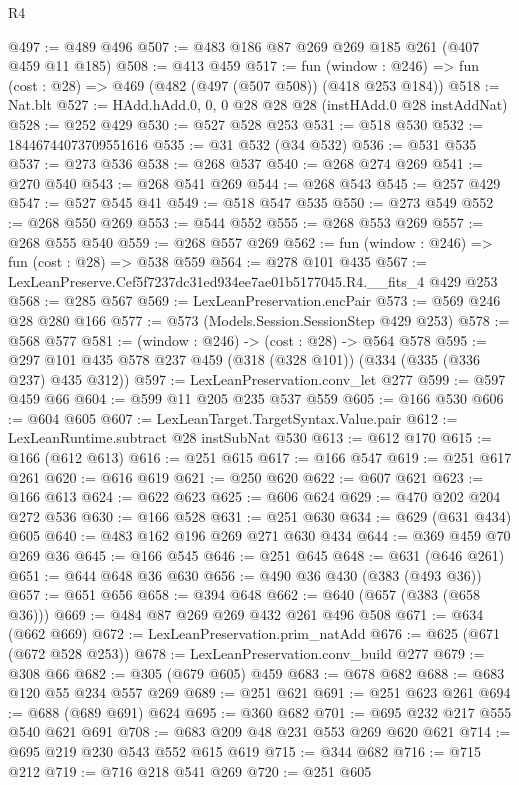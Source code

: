 \begin{lexlean}{R4}
\begin{coremodule}
@497 := @489 @496
@507 := @483 @186 @87 @269 @269 @185 @261 (@407 @459 @11 @185)
@508 := @413 @459
@517 := fun (window : @246) => fun (cost : @28) => @469 (@482 (@497 (@507 @508)) (@418 @253 @184))
@518 := Nat.blt
@527 := HAdd.hAdd.{0, 0, 0} @28 @28 @28 (instHAdd.{0} @28 instAddNat)
@528 := @252 @429
@530 := @527 @528 @253
@531 := @518 @530
@532 := 18446744073709551616
@535 := @31 @532 (@34 @532)
@536 := @531 @535
@537 := @273 @536
@538 := @268 @537
@540 := @268 @274 @269
@541 := @270 @540
@543 := @268 @541 @269
@544 := @268 @543
@545 := @257 @429
@547 := @527 @545 @41
@549 := @518 @547 @535
@550 := @273 @549
@552 := @268 @550 @269
@553 := @544 @552
@555 := @268 @553 @269
@557 := @268 @555 @540
@559 := @268 @557 @269
@562 := fun (window : @246) => fun (cost : @28) => @538 @559
@564 := @278 @101 @435
@567 := LexLeanPreserve.Cef5f7237dc31ed934ee7ae01b5177045.R4.__fits_4 @429 @253
@568 := @285 @567
@569 := LexLeanPreservation.encPair
@573 := @569 @246 @28 @280 @166
@577 := @573 (Models.Session.SessionStep @429 @253)
@578 := @568 @577
@581 := (window : @246) -> (cost : @28) -> @564 @578
@595 := @297 @101 @435 @578 @237 @459 (@318 (@328 @101)) (@334 (@335 (@336 @237) @435 @312))
@597 := LexLeanPreservation.conv_let @277
@599 := @597 @459 @66
@604 := @599 @11 @205 @235 @537 @559
@605 := @166 @530
@606 := @604 @605
@607 := LexLeanTarget.TargetSyntax.Value.pair
@612 := LexLeanRuntime.subtract @28 instSubNat @530
@613 := @612 @170
@615 := @166 (@612 @613)
@616 := @251 @615
@617 := @166 @547
@619 := @251 @617 @261
@620 := @616 @619
@621 := @250 @620
@622 := @607 @621
@623 := @166 @613
@624 := @622 @623
@625 := @606 @624
@629 := @470 @202 @204 @272 @536
@630 := @166 @528
@631 := @251 @630
@634 := @629 (@631 @434) @605
@640 := @483 @162 @196 @269 @271 @630 @434
@644 := @369 @459 @70 @269 @36
@645 := @166 @545
@646 := @251 @645
@648 := @631 (@646 @261)
@651 := @644 @648 @36 @630
@656 := @490 @36 @430 (@383 (@493 @36))
@657 := @651 @656
@658 := @394 @648
@662 := @640 (@657 (@383 (@658 @36)))
@669 := @484 @87 @269 @269 @432 @261 @496 @508
@671 := @634 (@662 @669)
@672 := LexLeanPreservation.prim_natAdd
@676 := @625 (@671 (@672 @528 @253))
@678 := LexLeanPreservation.conv_build @277
@679 := @308 @66
@682 := @305 (@679 @605) @459
@683 := @678 @682
@688 := @683 @120 @55 @234 @557 @269
@689 := @251 @621
@691 := @251 @623 @261
@694 := @688 (@689 @691) @624
@695 := @360 @682
@701 := @695 @232 @217 @555 @540 @621 @691
@708 := @683 @209 @48 @231 @553 @269 @620 @621
@714 := @695 @219 @230 @543 @552 @615 @619
@715 := @344 @682
@716 := @715 @212
@719 := @716 @218 @541 @269
@720 := @251 @605

\end{coremodule}
\end{lexlean}
